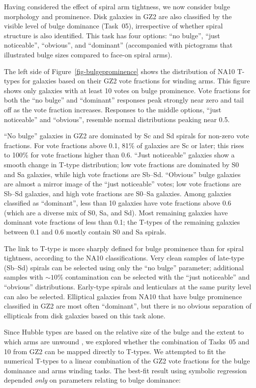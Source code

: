 \documentclass[useAMS,usenatbib]{mn2e}
\begin{document}
Having considered the effect of spiral arm tightness, we now consider bulge morphology and prominence. Disk galaxies in GZ2 are also classified by the visible level of bulge dominance (Task~05), irrespective of whether spiral structure is also identified. This task has four options: ``no bulge'', ``just noticeable'', ``obvious'', and ``dominant'' (accompanied with pictograms that illustrated bulge sizes compared to face-on spiral arms). 

The left side of Figure~\ref{fig-bulgeprominence} shows the distribution of NA10 T-types for galaxies based on their GZ2 vote fractions for winding arms. This figure shows only galaxies with at least 10 votes on bulge prominence. Vote fractions for both the ``no bulge'' and ``dominant'' responses peak strongly near zero and tail off as the vote fraction increases. Responses to the middle options, ``just noticeable'' and ``obvious'', resemble normal distributions peaking near 0.5. 

``No bulge'' galaxies in GZ2 are dominated by Sc and Sd spirals for non-zero vote fractions. For vote fractions above 0.1, 81\% of galaxies are Sc or later; this rises to 100\% for vote fractions higher than 0.6. ``Just noticeable'' galaxies show a smooth change in T-type distribution; low vote fractions are dominated by S0 and Sa galaxies, while high vote fractions are Sb--Sd. ``Obvious'' bulge galaxies are almost a mirror image of the ``just noticeable'' votes; low vote fractions are Sb--Sd galaxies, and high vote fractions are S0--Sa galaxies. Among galaxies classified as ``dominant'', less than 10 galaxies have vote fractions above 0.6 (which are a diverse mix of S0, Sa, and Sd). Most remaining galaxies have dominant vote fractions of less than 0.1; the T-types of the remaining galaxies between 0.1 and 0.6 mostly contain S0 and Sa spirals. 

The link to T-type is more sharply defined for bulge prominence than for spiral tightness, according to the NA10 classifications. Very clean samples of late-type (Sb--Sd) spirals can be selected using only the ``no bulge'' parameter; additional samples with $\sim10$\% contamination can be selected with the ``just noticeable'' and ``obvious'' distributions. Early-type spirals and lenticulars at the same purity level can also be selected. Elliptical galaxies from NA10 that have bulge prominence classified in GZ2 are most often ``dominant'', but there is no obvious separation of ellipticals from disk galaxies based on this task alone. 

Since Hubble types are based on the relative size of the bulge and the extent to which arms are unwound \citep{hub26}, we explored whether the combination of Tasks~05 and 10 from GZ2 can be mapped directly to T-types. We attempted to fit the numerical T-types to a linear combination of the GZ2 vote fractions for the bulge dominance and arms winding tasks. The best-fit result using symbolic regression \citep{sch09c} depended {\em only} on parameters relating to bulge dominance:
\end{document}
